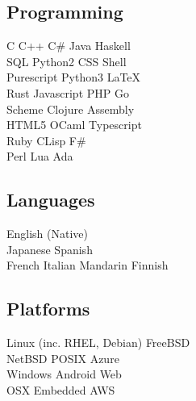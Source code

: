 \documentclass[a4paper]{cv}
\begin{document}
\begin{minipage}[t]{0.33\textwidth}
\subsection{Programming}

C \textbullet{} C++ \textbullet{} C\# \textbullet{} Java \textbullet{} Haskell \\
SQL \textbullet{} Python2 \textbullet{} CSS \textbullet{} Shell \\
Purescript \textbullet{} Python3 \textbullet{} \LaTeX\ \\\vspace{4pt}
Rust \textbullet{} Javascript \textbullet{} PHP \textbullet{} Go \\
Scheme \textbullet{} Clojure \textbullet{} Assembly \\
{\small HTML5} \textbullet{} OCaml \textbullet{} Typescript \\\vspace{4pt}
Ruby \textbullet{} CLisp \textbullet{} F\# \\
Perl \textbullet{} Lua \textbullet{} Ada

\sectionspace %

\subsection{Languages}
English (Native) \\\vspace{4pt}
Japanese \textbullet{} Spanish \\\vspace{4pt}
French \textbullet{} Italian \textbullet{} Mandarin \textbullet{} Finnish

\sectionspace %

\subsection{Platforms}
Linux (inc. RHEL, Debian) \textbullet{} FreeBSD \\
NetBSD \textbullet{} POSIX \textbullet{} Azure \\\vspace{4pt}
Windows \textbullet{} Android \textbullet{} Web \\\vspace{4pt}
OSX \textbullet{} Embedded \textbullet{} AWS


\end{minipage} %
\end{document}
